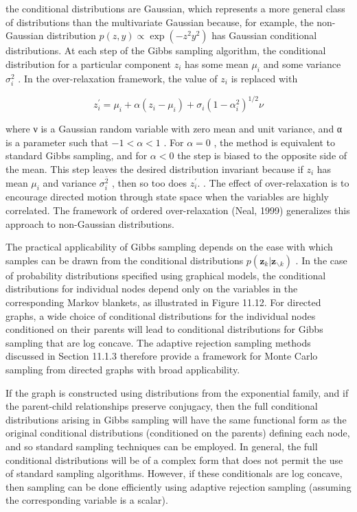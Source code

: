 \documentclass[
  10
]{article}
\begin{document}
the conditional distributions are Gaussian, which represents a more
general class of distributions than the multivariate Gaussian because,
for example, the non-Gaussian distribution
\(p ( z , y ) \propto \exp ( - z ^ { 2 } y ^ { 2 } )\) has Gaussian
conditional distributions. At each step of the Gibbs sampling algorithm,
the conditional distribution for a particular component \(z _ { i }\)
has some mean \(\mu _ { i }\) and some variance
\(\sigma _ { i } ^ { 2 }\) . In the over-relaxation framework, the value
of \(z _ { i }\) is replaced with

\[
z _ {i} ^ {\prime} = \mu_ {i} + \alpha (z _ {i} - \mu_ {i}) + \sigma_ {i} (1 - \alpha_ {i} ^ {2}) ^ {1 / 2} \nu\tag{11.50}
\]

where ν is a Gaussian random variable with zero mean and unit variance,
and α is a parameter such that \(- 1 < \alpha < 1\) . For \(\alpha = 0\)
, the method is equivalent to standard Gibbs sampling, and for
\(\alpha < 0\) the step is biased to the opposite side of the mean. This
step leaves the desired distribution invariant because if \(z _ { i }\)
has mean \(\mu _ { i }\) and variance
\(\sigma _ { i } ^ { \bar { 2 } }\) , then so too does
\(z _ { i } ^ { \prime } .\) . The effect of over-relaxation is to
encourage directed motion through state space when the variables are
highly correlated. The framework of ordered over-relaxation (Neal, 1999)
generalizes this approach to non-Gaussian distributions.

The practical applicability of Gibbs sampling depends on the ease with
which samples can be drawn from the conditional distributions
\(p ( \boldsymbol { z } _ { k } | \mathbf { z } _ { \backslash k } )\) .
In the case of probability distributions specified using graphical
models, the conditional distributions for individual nodes depend only
on the variables in the corresponding Markov blankets, as illustrated in
Figure 11.12. For directed graphs, a wide choice of conditional
distributions for the individual nodes conditioned on their parents will
lead to conditional distributions for Gibbs sampling that are log
concave. The adaptive rejection sampling methods discussed in Section
11.1.3 therefore provide a framework for Monte Carlo sampling from
directed graphs with broad applicability.

If the graph is constructed using distributions from the exponential
family, and if the parent-child relationships preserve conjugacy, then
the full conditional distributions arising in Gibbs sampling will have
the same functional form as the original conditional distributions
(conditioned on the parents) defining each node, and so standard
sampling techniques can be employed. In general, the full conditional
distributions will be of a complex form that does not permit the use of
standard sampling algorithms. However, if these conditionals are log
concave, then sampling can be done efficiently using adaptive rejection
sampling (assuming the corresponding variable is a scalar).
\end{document}
